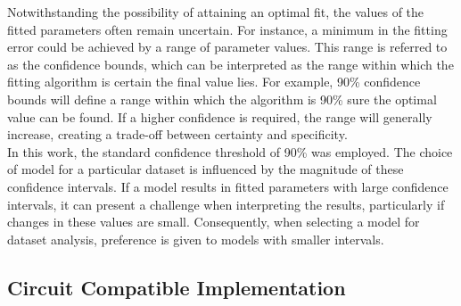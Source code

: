 

\noindent Notwithstanding the possibility of attaining an optimal fit, the values of the fitted parameters often remain uncertain. For instance, a minimum in the fitting error could be achieved by a range of parameter values. This range is referred to as the confidence bounds, which can be interpreted as the range within which the fitting algorithm is certain the final value lies. For example, 90\% confidence bounds will define a range within which the algorithm is 90\% sure the optimal value can be found. If a higher confidence is required, the range will generally increase, creating a trade-off between certainty and specificity. \\

\noindent In this work, the standard confidence threshold of 90\% was employed. The choice of model for a particular dataset is influenced by the magnitude of these confidence intervals. If a model results in fitted parameters with large confidence intervals, it can present a challenge when interpreting the results, particularly if changes in these values are small. Consequently, when selecting a model for dataset analysis, preference is given to models with smaller intervals.

\subsection[Circuit Compatible Implementation]{Circuit Compatible Implementation}


